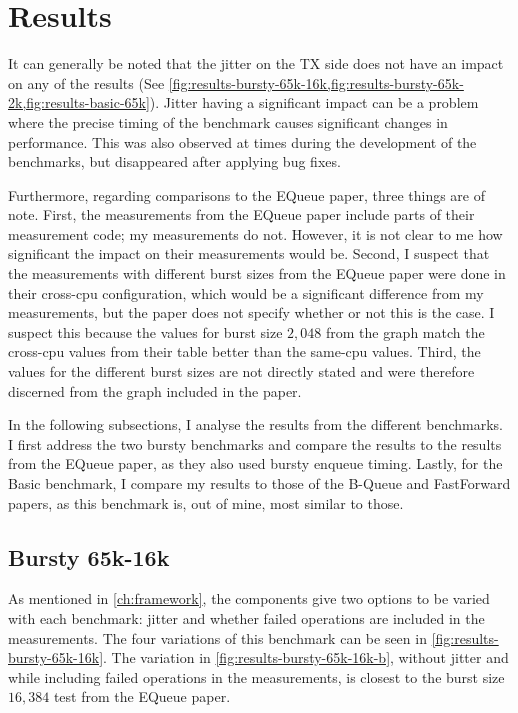 \section{Results}
It can generally be noted that the jitter on the TX side does not have an impact on any of the results
(See \cref{fig:results-bursty-65k-16k,fig:results-bursty-65k-2k,fig:results-basic-65k}).
Jitter having a significant impact can be a problem where the precise timing of the benchmark causes
significant changes in performance.
This was also observed at times during the development of the benchmarks, but disappeared after applying bug fixes.

Furthermore, regarding comparisons to the EQueue paper, three things are of note.
First, the measurements from the EQueue paper include parts of their measurement code; my measurements do
not\cite{EQueueGithub}.
However, it is not clear to me how significant the impact on their measurements would be.
Second, I suspect that the measurements with different burst sizes from the EQueue paper were done in their
cross-cpu configuration, which would be a significant difference from my measurements, but the paper does not
specify whether or not this is the case.
I suspect this because the values for burst size $2,048$ from the graph match the cross-cpu values from their
table better than the same-cpu values.
Third, the values for the different burst sizes are not directly stated and were therefore discerned from the
graph included in the paper.

In the following subsections, I analyse the results from the different benchmarks.
I first address the two bursty benchmarks and compare the results to the results from the EQueue paper, as
they also used bursty enqueue timing.
Lastly, for the Basic benchmark, I compare my results to those of the B-Queue and FastForward papers, as this
benchmark is, out of mine, most similar to those.

\subsection{Bursty 65k-16k}

As mentioned in \autoref{ch:framework}, the components give two options to be varied with each benchmark:
jitter and whether failed operations are included in the measurements.
The four variations of this benchmark can be seen in \autoref{fig:results-bursty-65k-16k}.
The variation in \autoref{fig:results-bursty-65k-16k-b}, without jitter and while including failed operations
in the measurements, is closest to the burst size $16,384$ test from the EQueue paper\cite{EQueue}.

